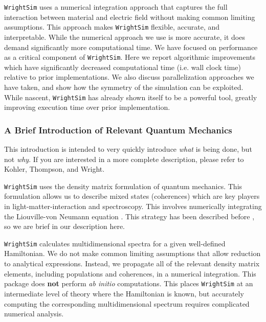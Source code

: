 \texttt{WrightSim} uses a numerical integration approach that captures
the full interaction between material and electric field without making
common limiting assumptions. This approach makes \texttt{WrightSim}
flexible, accurate, and interpretable. While the numerical approach we
use is more accurate, it does demand significantly more computational
time. We have focused on performance as a critical component of
\texttt{WrightSim}. Here we report algorithmic improvements which have
significantly decreased computational time (i.e. wall clock time)
relative to prior implementations. We also discuss parallelization
approaches we have taken, and show how the symmetry of the simulation
can be exploited. While nascent, \texttt{WrightSim} has already shown
itself to be a powerful tool, greatly improving execution time over
prior implementation.

\hypertarget{a-brief-introduction-of-relevant-quantum-mechanics}{%
\subsubsection{A Brief Introduction of Relevant Quantum
Mechanics}\label{a-brief-introduction-of-relevant-quantum-mechanics}}

This introduction is intended to very quickly introduce \emph{what} is
being done, but not \emph{why}. If you are interested in a more complete
description, please refer to Kohler, Thompson, and Wright.
\cite{KohlerDanielDavid2017a}

\texttt{WrightSim} uses the density matrix formulation of quantum
mechanics. This formulation allows us to describe mixed states
(coherences) which are key players in light-matter-interaction and
spectroscopy. This involves numerically integrating the Liouville-von
Neumann equation \cite{Gibbs1902}. This strategy has been described
before \cite{Gelin_2009}, so we are brief in our description here.

\texttt{WrightSim} calculates multidimensional spectra for a given
well-defined Hamiltonian. We do not make common limiting assumptions
that allow reduction to analytical expressions. Instead, we propagate
all of the relevant density matrix elements, including populations and
coherences, in a numerical integration. This package does \textbf{not}
perform \emph{ab initio} computations. This places \texttt{WrightSim} at
an intermediate level of theory where the Hamiltonian is known, but
accurately computing the corresponding multidimensional spectrum
requires complicated numerical analysis.

